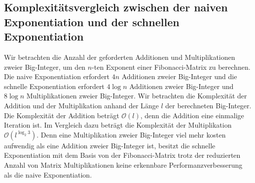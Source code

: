 \documentclass[course=erap]{aspdoc}
\begin{document}
\subsection{Komplexitätsvergleich zwischen der naiven Exponentiation und der schnellen Exponentiation}
Wir betrachten die Anzahl der geforderten Additionen und Multiplikationen zweier Big-Integer, um den $n$-ten Exponent einer Fibonacci-Matrix zu berechnen. Die naive Exponentiation erfordert $4n$ Additionen zweier Big-Integer und die schnelle Exponentiation erfordert $4\log n$ Additionen zweier Big-Integer und $8\log n$ Multiplikationen zweier Big-Integer. Wir betrachten die Komplexität der Addition und der Multiplikation anhand der Länge $l$ der berechneten Big-Integer. Die Komplexität der Addition beträgt $\mathcal{O}(l)$, denn die Addition eine einmalige Iteration ist. Im Vergleich dazu beträgt die Komplexität der Multiplikation $\mathcal{O}(l^{\log_{2}{3}})$\cite{karatsubaMultiplication}. Denn eine Multiplikation zweier Big-Integer viel mehr kosten aufwendig als eine Addition zweier Big-Integer ist, besitzt die schnelle Exponentiation mit dem Basis von der Fibonacci-Matrix trotz der reduzierten Anzahl von Matrix Multiplikationen keine erkennbare Performanzverbesserung als die naive Exponentiation.
\end{document}
